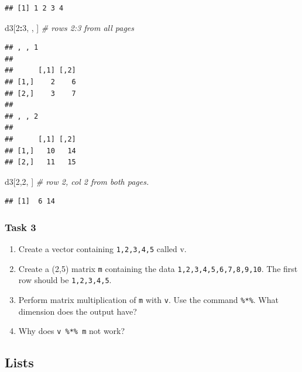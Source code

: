 \documentclass[]{book}
\newenvironment{Shaded}{\begin{snugshade}}{\end{snugshade}}
\newcommand{\DecValTok}[1]{\textcolor[rgb]{0.00,0.00,0.81}{#1}}
\newcommand{\CommentTok}[1]{\textcolor[rgb]{0.56,0.35,0.01}{\textit{#1}}}
\newcommand{\OperatorTok}[1]{\textcolor[rgb]{0.81,0.36,0.00}{\textbf{#1}}}
\newcommand{\NormalTok}[1]{#1}
\providecommand{\tightlist}{%
  \setlength{\itemsep}{0pt}\setlength{\parskip}{0pt}}
\theoremstyle{definition}
\theoremstyle{definition}
\theoremstyle{definition}
\theoremstyle{remark}
\begin{document}
\begin{verbatim}
## [1] 1 2 3 4
\end{verbatim}

\begin{Shaded}
\begin{Highlighting}[]
\NormalTok{d3[}\DecValTok{2}\OperatorTok{:}\DecValTok{3}\NormalTok{, , ]  }\CommentTok{# rows 2:3 from all pages}
\end{Highlighting}
\end{Shaded}

\begin{verbatim}
## , , 1
## 
##      [,1] [,2]
## [1,]    2    6
## [2,]    3    7
## 
## , , 2
## 
##      [,1] [,2]
## [1,]   10   14
## [2,]   11   15
\end{verbatim}

\begin{Shaded}
\begin{Highlighting}[]
\NormalTok{d3[}\DecValTok{2}\NormalTok{,}\DecValTok{2}\NormalTok{, ]  }\CommentTok{# row 2, col 2 from both pages.}
\end{Highlighting}
\end{Shaded}

\begin{verbatim}
## [1]  6 14
\end{verbatim}

\subsubsection{Task 3}\label{task-3}

\begin{enumerate}
\def\labelenumi{\arabic{enumi}.}
\tightlist
\item
  Create a vector containing \texttt{1,2,3,4,5} called v.
\item
  Create a (2,5) matrix \texttt{m} containing the data
  \texttt{1,2,3,4,5,6,7,8,9,10}. The first row should be
  \texttt{1,2,3,4,5}.
\item
  Perform matrix multiplication of \texttt{m} with \texttt{v}. Use the
  command \texttt{\%*\%}. What dimension does the output have?
\item
  Why does \texttt{v\ \%*\%\ m} not work?
\end{enumerate}

\subsection{Lists}\label{lists}
\end{document}
